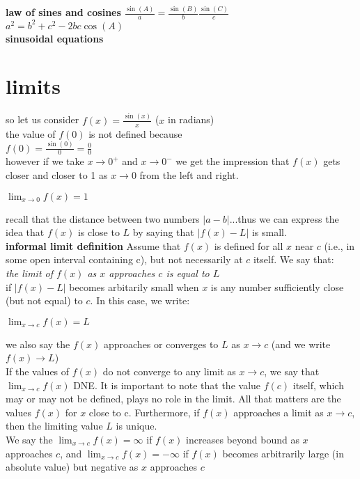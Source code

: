 \documentclass{article}
\begin{document}
\textbf{law of sines and cosines}
	$\frac{\sin(A)}{a} = \frac{\sin(B)}{b} \frac{\sin(C)}{c}$\\
	$a^2 = b^2 + c^2 - 2bc\cos(A)$\\

\textbf{sinusoidal equations}

\section*{limits}
	so let us consider $f(x) = \frac{\sin(x)}{x}$ ($x$ in radians)\\
	the value of $f(0)$ is not defined because\\
	$f(0) = \frac{\sin(0)}{0} = \frac{0}{0}$\\
	however if we take $x \to 0^{+}$ and $x \to 0^{-}$ we get the impression that $f(x)$ gets closer and closer to 1 as $x \to 0$ from the left and right.
	\begin{center}
		$\lim_{x \to 0}f(x) = 1$
	\end{center}
	recall that the distance between two numbers $\lvert a - b\rvert$...thus we can express the idea that $f(x)$ is close to $L$ by saying that $\lvert f(x) - L\rvert$ is small.\\

	\textbf{informal limit definition} Assume that $f(x)$ is defined for all $x$ near $c$ (i.e., in some open interval containing c), but not necessarily at $c$ itself. We say that:\\
	\textit{the limit of $f(x)$ as $x$ approaches $c$ is equal to $L$}\\
	if $\lvert f(x) - L\rvert$ becomes arbitarily small when $x$ is any number sufficiently close (but not equal) to $c$. In this case, we write:
	\begin{center}
		$\lim_{x \to c}f(x) = L$
	\end{center}
	we also say the $f(x)$ approaches or converges to $L$ as $x \to c$ (and we write $f(x) \to L$)\\

	If the values of $f(x)$ do not converge to any limit as $x \to c$, we say that $\lim_{x \to c}f(x)$ DNE. It is important to note that the value $f(c)$ itself, which may or may not be defined, plays no role in the limit. All that matters are the values $f(x)$ for $x$ close to c. Furthermore, if $f(x)$ approaches a limit as $x \to c$, then the limiting value $L$ is unique.\\

	We say the $\lim_{x \to c}f(x) = \infty$ if $f(x)$ increases beyond bound as $x$ approaches $c$, and $\lim_{x \to c}f(x) = -\infty$ if $f(x)$ becomes arbitrarily large (in absolute value) but negative as $x$ approaches $c$
\end{document}
